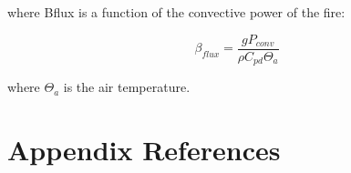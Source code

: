 where Bflux is a function of the convective power of the fire:

\begin{equation}
\beta_{flux} = \frac{gP_{conv}}{\rho C_{pd} \Theta_{a}}
\end{equation}

where $\Theta_{a}$ is the air temperature.

\clearpage

\section{Appendix References}


\newenvironment{mybibliography}
 {%
  \setlength{\leftskip}{2em}%
  \setlength{\parindent}{-\leftskip}}
 {}
 
